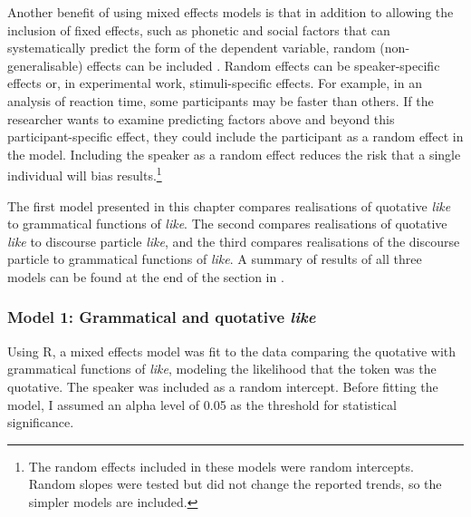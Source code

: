Another benefit of using mixed effects models is that in addition to allowing the inclusion of fixed effects, such as phonetic and social factors that can systematically predict the form of the dependent variable, random (non-generalisable) effects can be included \citep[263-326]{baayen2008}.  Random effects can be speaker-specific effects or, in experimental work, stimuli-specific effects. For example, in an analysis of reaction time, some participants may be faster than others. If the researcher wants to examine predicting factors above and beyond this participant-specific effect, they could include the participant as a random effect in the model. Including the speaker as a random effect reduces the risk that a single individual will bias results.\footnote{The random effects included in these models were random intercepts. Random slopes were tested but did not change the reported trends, so the simpler models are included.} 

The first model presented in this chapter compares realisations of quotative \textit{like} to grammatical functions of \textit{like}. The second compares realisations of quotative \textit{like} to discourse particle \textit{like}, and the third compares realisations of the discourse particle to grammatical functions of \textit{like}. A summary of results of all three models can be found at the end of the section in . 

\subsubsection{Model 1: Grammatical and quotative \textit{like}}

Using R, a mixed effects model was fit to the data comparing the quotative with grammatical functions of \textit{like}, modeling the likelihood that the token was the quotative. The speaker was included as a random intercept. Before fitting the model, I assumed an alpha level of 0.05 as the threshold for statistical significance. 


